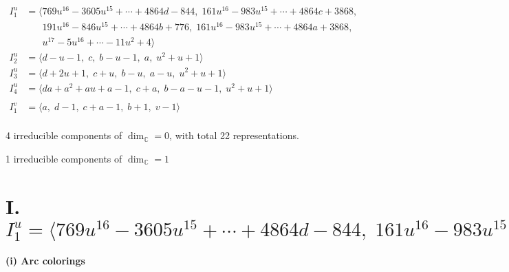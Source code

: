 \documentclass[1p]{elsarticle_modified}
\theoremstyle{definition}
\begin{document}
\begin{align*}
I^u_{1}&=\langle 
769 u^{16}-3605 u^{15}+\cdots+4864 d-844,\;161 u^{16}-983 u^{15}+\cdots+4864 c+3868,\\
\phantom{I^u_{1}}&\phantom{= \langle  }191 u^{16}-846 u^{15}+\cdots+4864 b+776,\;161 u^{16}-983 u^{15}+\cdots+4864 a+3868,\\
\phantom{I^u_{1}}&\phantom{= \langle  }u^{17}-5 u^{16}+\cdots-11 u^2+4\rangle \\
I^u_{2}&=\langle 
d- u-1,\;c,\;b- u-1,\;a,\;u^2+u+1\rangle \\
I^u_{3}&=\langle 
d+2 u+1,\;c+u,\;b- u,\;a- u,\;u^2+u+1\rangle \\
I^u_{4}&=\langle 
d a+a^2+a u+a-1,\;c+a,\;b- a- u-1,\;u^2+u+1\rangle \\
\\
I^v_{1}&=\langle 
a,\;d-1,\;c+a-1,\;b+1,\;v-1\rangle \\
\end{align*}
\raggedright * 4 irreducible components of $\dim_{\mathbb{C}}=0$, with total 22 representations.\\
\raggedright * 1 irreducible components of $\dim_{\mathbb{C}}=1$ \\
\newpage
\renewcommand{\arraystretch}{1}
\centering \section*{I. $I^u_{1}= \langle 769 u^{16}-3605 u^{15}+\cdots+4864 d-844,\;161 u^{16}-983 u^{15}+\cdots+4864 c+3868,\;191 u^{16}-846 u^{15}+\cdots+4864 b+776,\;161 u^{16}-983 u^{15}+\cdots+4864 a+3868,\;u^{17}-5 u^{16}+\cdots-11 u^2+4 \rangle$}
\flushleft \textbf{(i) Arc colorings}\\
\end{document}
